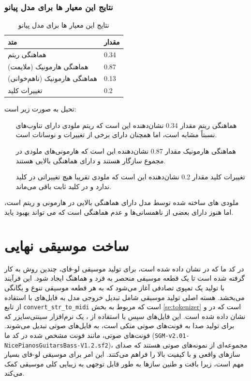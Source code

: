 \subsubsection{نتایج این معیار ها برای مدل پیانو}
\begin{table}
      \centering
      \caption{نتایج این معیار ها برای مدل پیانو}
      \label{resultPi}
      \begin{tabular}{|l|l|}
            \hline
            متد                          & مقدار \\ \hline
            هماهنگی ریتم                 & 0.34  \\ \hline
            هماهنگی هارمونیک (ملایمت)    & 0.87  \\ \hline
            هماهنگی هارمونیک (نا‌هم‌خوانی) & 0.13  \\ \hline
            تغییرات کلید                 & 0.2   \\ \hline
      \end{tabular}
\end{table}
تحیل   به صورت زیر است:
\begin{itemize}
      \item[هماهنگی ریتم] مقدار 0.34 نشان‌دهنده این است که ریتم ملودی دارای تناوب‌های نسبتاً مشابه است، اما همچنان دارای برخی از تغییرات و نوسانات است.
      \item[هماهنگی هارمونیک] مقدار 0.87 نشان‌دهنده این است که هارمونی‌های ملودی در مجموع سازگار هستند و دارای هماهنگی بالایی هستند.
      \item[تغییرات کلید] مقدار 0.2 نشان‌دهنده این است که ملودی تقریبا هیچ تغییراتی در کلید ندارد و در کلید ثابت باقی می‌ماند.
\end{itemize}

ملودی های ساخته شده توسط مدل دارای هماهنگی بالایی در هارمونی و ریتم است، اما هنوز دارای بعضی از ناهمسانی‌ها و عدم هماهنگی است که می تواند بهبود یابد.

\section{ساخت موسیقی نهایی}\label{finalMusic}
در کد ما که در  نشان داده شده است، برای تولید موسیقی لو-فای، چندین روش به کار گرفته شده است
تا یک قطعه موسیقی منحصر به فرد و هماهنگ ایجاد شود. این فرآیند با تولید
یک تمپوی تصادفی آغاز می‌شود که به هر قطعه موسیقی تنوع و یگانگی می‌بخشد.
هسته اصلی تولید موسیقی شامل تبدیل خروجی مدل به فایل‌های  با استفاده
از تابع \texttt{convert\_str\_to\_midi} است که مربوط به بخش \ref{se:tokenizer} است که در  و  نشان داده شده است. این فایل‌های  سپس با
استفاده از ، یک نرم‌افزار سینتی‌سایزر که برای تولید صدا به
فونت‌های صوتی متکی است، به فایل‌های صوتی تبدیل می‌شوند. فونت‌های صوتی، مانند
فونت مشخص شده در کد ما
(\texttt{SGM-v2.01-NicePianosGuitarsBass-V1.2.sf2})، مجموعه‌ای از
نمونه‌های صوتی هستند که صدای سازهای واقعی و با کیفیت بالا را فراهم
می‌کنند. این امر برای موسیقی لو-فای بسیار مهم است، زیرا بافت و طنین سازها
به طور قابل توجهی به زیبایی کلی موسیقی کمک می‌کند.

